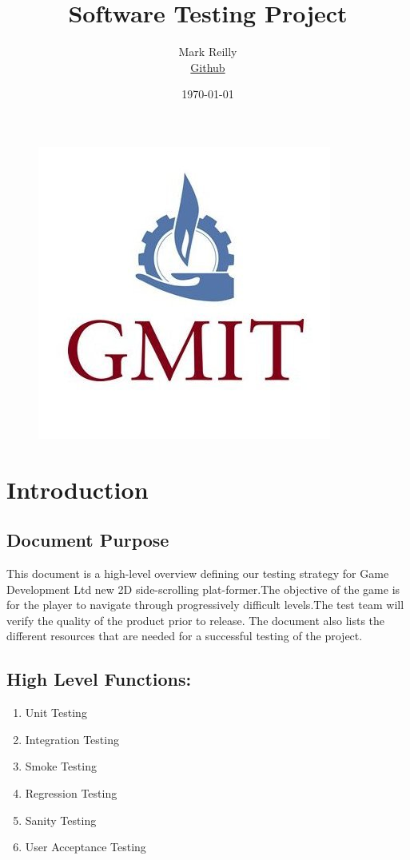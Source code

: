 \documentclass{article}
\title{Software Testing Project}
\author{
  Mark Reilly\\
  \href{https://github.com/MarkReillyGMIT}{Github}
}
\date{\today}
\begin{document}
\begin{figure}
    \centering
    \includegraphics[scale=0.3]{./images/gmit.jpg}
\end{figure}

\maketitle


\tableofcontents
\newpage


\section{Introduction}
\subsection{Document Purpose}
This document is a high-level overview defining our testing strategy for Game Development Ltd  new 2D side-scrolling plat-former.The 
objective of the game is for the player to navigate through progressively difficult levels.The test team will verify the quality of the product prior to release. The document also lists the different resources that are needed for a successful testing of the project.

\subsection{High Level Functions:}
\begin{enumerate}
    \item Unit Testing
    \item Integration Testing
    \item Smoke  Testing
    \item Regression  Testing
    \item Sanity  Testing
    \item User Acceptance Testing
\end{enumerate}
\end{document}
